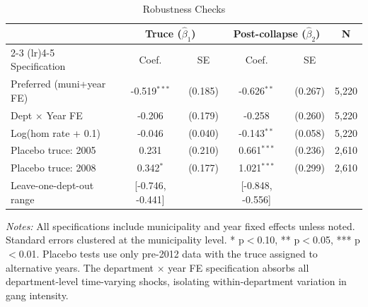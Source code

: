 \begin{table}[H]
\centering
\caption{Robustness Checks}
\label{tab:robustness}
\begin{threeparttable}
\begin{tabular}{lccccc}
\toprule
 & \multicolumn{2}{c}{Truce ($\hat{\beta}_1$)} & \multicolumn{2}{c}{Post-collapse ($\hat{\beta}_2$)} & N \\
\cmidrule(lr){2-3} \cmidrule(lr){4-5}
Specification & Coef. & SE & Coef. & SE & \\
\midrule
Preferred (muni+year FE) & -0.519$^{***}$ & (0.185) & -0.626$^{**}$ & (0.267) & 5,220 \\
Dept $\times$ Year FE & -0.206 & (0.179) & -0.258 & (0.260) & 5,220 \\
Log(hom rate + 0.1) & -0.046 & (0.040) & -0.143$^{**}$ & (0.058) & 5,220 \\
Placebo truce: 2005 & 0.231 & (0.210) & 0.661$^{***}$ & (0.236) & 2,610 \\
Placebo truce: 2008 & 0.342$^{*}$ & (0.177) & 1.021$^{***}$ & (0.299) & 2,610 \\
\midrule
Leave-one-dept-out range & [-0.746, -0.441] & & [-0.848, -0.556] & & \\
\bottomrule
\end{tabular}
\begin{tablenotes}[flushleft]
\small
\item \textit{Notes:} All specifications include municipality and year fixed effects unless noted. Standard errors clustered at the municipality level. * p$<$0.10, ** p$<$0.05, *** p$<$0.01. Placebo tests use only pre-2012 data with the truce assigned to alternative years. The department $\times$ year FE specification absorbs all department-level time-varying shocks, isolating within-department variation in gang intensity.
\end{tablenotes}
\end{threeparttable}
\end{table}
